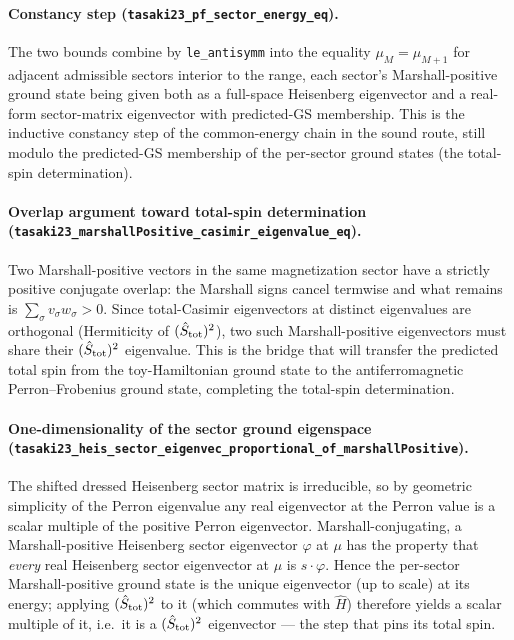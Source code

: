 \documentclass[a4paper,11pt]{article}
\begin{document}
\paragraph{Constancy step (\texttt{tasaki23\_pf\_sector\_energy\_eq}).}
The two bounds combine by \texttt{le\_antisymm} into the equality
$\mu_M=\mu_{M+1}$ for adjacent admissible sectors interior to the range,
each sector's Marshall-positive ground state being given both as a
full-space Heisenberg eigenvector and a real-form sector-matrix
eigenvector with predicted-GS membership.  This is the inductive
constancy step of the common-energy chain in the sound route, still
modulo the predicted-GS membership of the per-sector ground states (the
total-spin determination).

\paragraph{Overlap argument toward total-spin determination
(\texttt{tasaki23\_marshallPositive\_casimir\_eigenvalue\_eq}).} Two
Marshall-positive vectors in the same magnetization sector have a strictly
positive conjugate overlap: the Marshall signs cancel termwise and what
remains is $\sum_\sigma v_\sigma w_\sigma>0$. Since total-Casimir
eigenvectors at distinct eigenvalues are orthogonal (Hermiticity of
$(\hat S_{\rm tot})^2$), two such Marshall-positive eigenvectors must share
their $(\hat S_{\rm tot})^2$ eigenvalue. This is the bridge that will
transfer the predicted total spin from the toy-Hamiltonian ground state to
the antiferromagnetic Perron--Frobenius ground state, completing the
total-spin determination.

\paragraph{One-dimensionality of the sector ground eigenspace
(\texttt{tasaki23\_heis\_sector\_eigenvec\_proportional\_of\_marshallPositive}).}
The shifted dressed Heisenberg sector matrix is irreducible, so by geometric
simplicity of the Perron eigenvalue any real eigenvector at the Perron value
is a scalar multiple of the positive Perron eigenvector. Marshall-conjugating,
a Marshall-positive Heisenberg sector eigenvector $\varphi$ at $\mu$ has the
property that \emph{every} real Heisenberg sector eigenvector at $\mu$ is
$s\cdot\varphi$. Hence the per-sector Marshall-positive ground state is the
unique eigenvector (up to scale) at its energy; applying $(\hat S_{\rm tot})^2$
to it (which commutes with $\hat H$) therefore yields a scalar multiple of it,
i.e.\ it is a $(\hat S_{\rm tot})^2$ eigenvector — the step that pins its total
spin.
\end{document}
